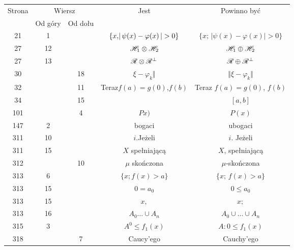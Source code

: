 \documentclass[a4paper,11pt]{article}
\numberwithin{equation}{section}
\begin{document}
\newpage



\begin{center}

  \begin{tabular}{|c|c|c|c|c|}
    \hline
    Strona & \multicolumn{2}{c|}{Wiersz} & Jest
                              & Powinno być \\ \cline{2-3}
    & Od góry & Od dołu & & \\
    \hline
    21  &  1 & & $\{ x ,\! |\, {  \psi( x ) - \varphi( x )  } \,| > 0 \}$
           & $\{ x ;\, | \psi( x ) - \varphi( x )| > 0 \}$ \\
    27  & 12 & & $\mathcal{H}_{ 1 } \otimes \mathcal{H}_{ 2 }$ & $\mathcal{H}_{ 1 } \oplus \mathcal{H}_{ 2 }$ \\
    27  & 13 & & $\mathcal{R} \otimes \mathcal{R}^{ \bot }$ & $\mathcal{R} \oplus \mathcal{R}^{ \bot }$ \\
    30  & & 18 & $\xi - \varphi_{ k } \Vert$ & $\Vert \xi - \varphi_{ k } \Vert$ \\
    32  & & 11 & Teraz$f( a ) = g( 0 )$,$f( b )$
           & Teraz $f( a ) = g( 0 )$, $f( b )$ \\
    34  & & 15 & & $[ a, b ]$ \\
    101 & &  4 & $Px )$ & $P( x )$ \\
    147 &  2 & & bogaci & ubogaci \\
    311 & 10 & & $i$.Jeżeli & $i$. Jeżeli \\
    311 & 15 & & $X$ spełniającą & $X$, spełniającą \\
    312 & & 10 & $\mu$ skończona & $\mu$-skończona \\
    313 &  6 & & $\{ x ;\! f( x ) > a \}$ & $\{ x ;\, f( x ) > a \}$ \\
    313 & 15 & & $0 = a_{ 0 }$ & $0 \leq a_{ 0 }$ \\
    313 & 15 & & $x,$ & $x;$ \\
    313 & 16 & & $A_{ 0 } \ldots \cup A_{ n }$
           & $A_{ 0 } \cup \ldots \cup A_{ n }$ \\
    315 & 3 & & $A^{ 0 } \leq f_{ 1 }( x )$ & $A: 0 \leq f_{ 1 }( x )$ \\
    318 & & 7 & Caucy’ego & Cauchy’ego \\
    \hline
  \end{tabular}

\end{center}
\end{document}
